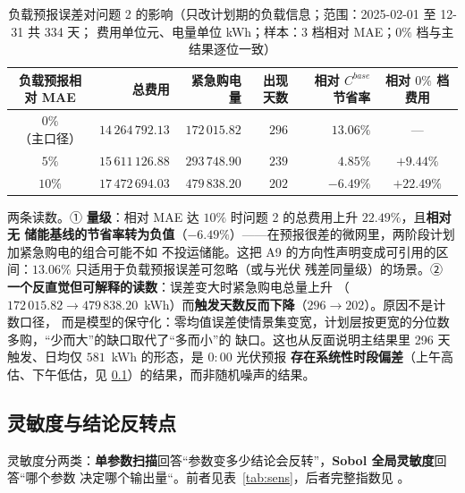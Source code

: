 \begin{table}[htbp]
  \centering
  \caption{负载预报误差对问题 2 的影响（只改计划期的负载信息；范围：2025-02-01 至 12-31 共 334 天；
           费用单位元、电量单位 kWh；样本：3 档相对 MAE；\(0\%\) 档与主结果逐位一致）}
  \label{tab:loaderr}
  \small
  \setlength{\tabcolsep}{5pt}
  \begin{tabular}{crrrrc}
    \toprule
    负载预报相对 MAE & 总费用 & 紧急购电量 & 出现天数 & 相对 \(C^{base}\) 节省率 & 相对 \(0\%\) 档费用 \\
    \midrule
    \(0\%\)（主口径） & \(14\,264\,792.13\) & \(172\,015.82\) & \(296\) & \(13.06\%\) & --- \\
    \(5\%\)           & \(15\,611\,126.88\) & \(293\,748.90\) & \(239\) & \(4.85\%\)  & \(+9.44\%\) \\
    \(10\%\)          & \(17\,472\,694.03\) & \(479\,838.20\) & \(202\) & \(-6.49\%\) & \(+22.49\%\) \\
    \bottomrule
  \end{tabular}
\end{table}

两条读数。① \textbf{量级}：相对 MAE 达 \(10\%\) 时问题 2 的总费用上升 \(22.49\%\)，且\textbf{相对无
储能基线的节省率转为负值}（\(-6.49\%\)）——在预报很差的微网里，两阶段计划加紧急购电的组合可能不如
不投运储能。这把 A9 的方向性声明变成可引用的区间：\(13.06\%\) 只适用于负载预报误差可忽略（或与光伏
残差同量级）的场景。② \textbf{一个反直觉但可解释的读数}：误差变大时紧急购电总量上升
（\(172\,015.82\to479\,838.20\)~kWh）而\textbf{触发天数反而下降}（\(296\to202\)）。原因不是计数口径，
而是模型的保守化：零均值误差使情景集变宽，计划层按更宽的分位数多购，“少而大”的缺口取代了“多而小”的
缺口。这也从反面说明主结果里 296 天触发、日均仅 \(581\)~kWh 的形态，是 \(0{:}00\) 光伏预报
\textbf{存在系统性时段偏差}（上午高估、下午低估，见 \ref{sec:sens}）的结果，而非随机噪声的结果。

\subsection{灵敏度与结论反转点}\label{sec:sens}

灵敏度分两类：\textbf{单参数扫描}回答“参数变多少结论会反转”，\textbf{Sobol 全局灵敏度}回答“哪个参数
决定哪个输出量“。前者见表~\ref{tab:sens}，后者完整指数见 。


